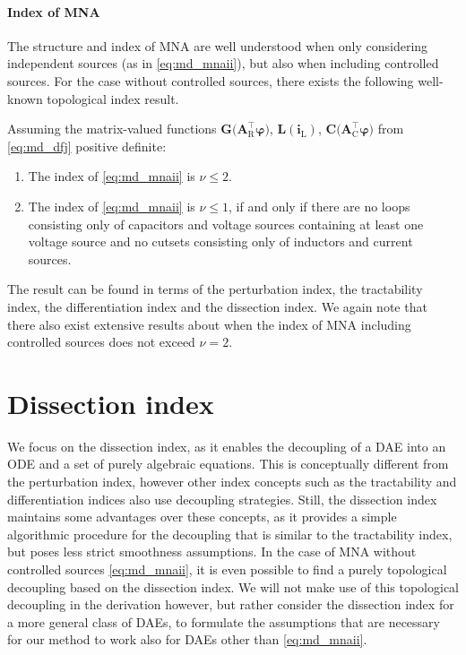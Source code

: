 \documentclass[AMA,STIX1COL]{WileyNJD-v2}
\newcommand{\mb}[1]{\mathbf{#1}}
\newcommand{\mr}[1]{\mathrm{#1}}
\newcommand{\T}{{\!\top}}
\newcommand{\AT}[1]{\mb{A}_\mr{#1}^{\T}}
\newcommand{\vphi}{\boldsymbol{\varphi}}
\renewcommand{\i}[1]{\mb{i}_\mr{#1}}
\begin{document}
\paragraph{Index of MNA}
The structure and index of MNA are well understood when only considering independent sources\cite{tischendorf1999} (as in \eqref{eq:md_mnaii}), but also when including controlled sources\cite{estevez2000ijcta}. For the case without controlled sources, there exists the following well-known topological index result.
\begin{theorem}
    \label{th:ic_imna}
    Assuming the matrix-valued functions $\mb{G} \big( \AT{R} \vphi \big)$, $\mb{L}(\i{L})$, $\mb{C} \big( \AT{C} \vphi \big)$ from \eqref{eq:md_dfj} positive definite:
    \begin{enumerate}
        \item The index of \eqref{eq:md_mnaii} is $\nu \leq 2$.
        \item The index of \eqref{eq:md_mnaii} is $\nu \leq 1$, if and only if there are no loops consisting only of capacitors and voltage sources containing at least one voltage source and no cutsets consisting only of inductors and current sources.
    \end{enumerate}
\end{theorem}
The result can be found in terms of the perturbation index\cite{gunther1996}, the tractability index\cite{tischendorf1999}, the differentiation index\cite{estevez2000ijcta} and the dissection index\cite{jansen2014}. We again note that there also exist extensive results about when the index of MNA including controlled sources does not exceed $\nu = 2$\cite{estevez2000ijcta}.

\section{Dissection index}
\label{sec:di}
We focus on the dissection index, as it enables the decoupling of a DAE into an ODE and a set of purely algebraic equations. This is conceptually different from the perturbation index, however other index concepts such as the tractability and differentiation indices also use decoupling strategies. Still, the dissection index maintains some advantages over these concepts, as it provides a simple algorithmic procedure for the decoupling that is similar to the tractability index, but poses less strict smoothness assumptions. In the case of MNA without controlled sources \eqref{eq:md_mnaii}, it is even possible to find a purely topological decoupling based on the dissection index\cite{jansen2014}. We will not make use of this topological decoupling in the derivation however, but rather consider the dissection index for a more general class of DAEs, to formulate the assumptions that are necessary for our method to work also for DAEs other than \eqref{eq:md_mnaii}.
\end{document}
